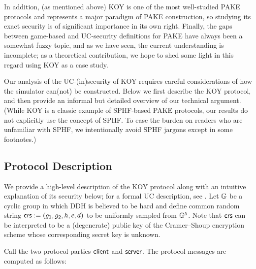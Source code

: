 In addition, (as mentioned above) KOY is one of the most well-studied PAKE protocols and represents a major paradigm of PAKE construction, so studying its exact security is of significant importance in its own right. Finally, the gaps between game-based and UC-security definitions for PAKE have always been a somewhat fuzzy topic, and as we have seen, the current understanding is incomplete; as a theoretical contribution, we hope to shed some light in this regard using KOY as a case study.

Our analysis of the UC-(in)security of KOY requires careful considerations of how the simulator can(not) be constructed. Below we first describe the KOY protocol, and then provide an informal but detailed overview of our technical argument. (While KOY is a classic example of SPHF-based PAKE protocols, our results do not explicitly use the concept of SPHF. To ease the burden on readers who are unfamiliar with SPHF, we intentionally avoid SPHF jargons except in some footnotes.)

\subsection{Protocol Description}
\label{description}
We provide a high-level description of the KOY protocol along with an intuitive explanation of its security below; for a formal UC description, see . Let $\mathbb{G}$ be a cyclic group in which DDH is believed to be hard and define common random string $\mathsf{crs} := (g_1, g_2, h, c, d)$ to be uniformly sampled from $\mathbb{G}^5$. Note that $\mathsf{crs}$ can be interpreted to be a (degenerate) public key of the Cramer--Shoup encryption scheme whose corresponding secret key is unknown.

Call the two protocol parties $\mathsf{client}$ and $\mathsf{server}$. The protocol messages are computed as follows:

